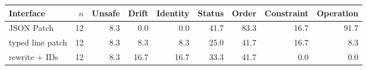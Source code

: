 \begin{tabular}{lrrrrrrrr}
\toprule
Interface & $n$ & Unsafe & Drift & Identity & Status & Order & Constraint & Operation \\
\midrule
JSON Patch & 12 & 8.3 & 0.0 & 0.0 & 41.7 & 83.3 & 16.7 & 91.7 \\
typed line patch & 12 & 8.3 & 8.3 & 8.3 & 25.0 & 41.7 & 16.7 & 8.3 \\
rewrite + IDs & 12 & 8.3 & 16.7 & 16.7 & 33.3 & 41.7 & 0.0 & 0.0 \\
\bottomrule
\end{tabular}
